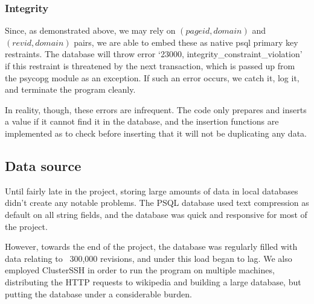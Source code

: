 \subsubsection*{Integrity}

Since, as demonstrated above, we may rely on $(pageid,domain)$ and
$(revid,domain)$ pairs, we are able to embed these as native psql
primary key restraints. The database will throw error `23000,
integrity\_constraint\_violation' if this restraint is threatened by
the next transaction, which is passed up from the psycopg module as an
exception.\cite{psql-error}\cite{psyc-error} If such an error occurs,
we catch it, log it, and terminate the program cleanly.

In reality, though, these errors are infrequent. The code only
prepares and inserts a value if it cannot find it in the database, and
the insertion functions are implemented as to check before inserting
that it will not be duplicating any data.

\subsection{Data source}

Until fairly late in the project, storing large amounts of data in
local databases didn't create any notable problems. The PSQL database
used text compression as default on all string fields,\cite{psql-comp}
and the database was quick and responsive for most of the project.

However, towards the end of the project, the database was regularly
filled with data relating to ~300,000 revisions, and under this load
began to lag. We also employed ClusterSSH in order to run the program
on multiple machines,\cite{clusterssh} distributing the HTTP requests
to wikipedia and building a large database, but putting the database
under a considerable burden.

